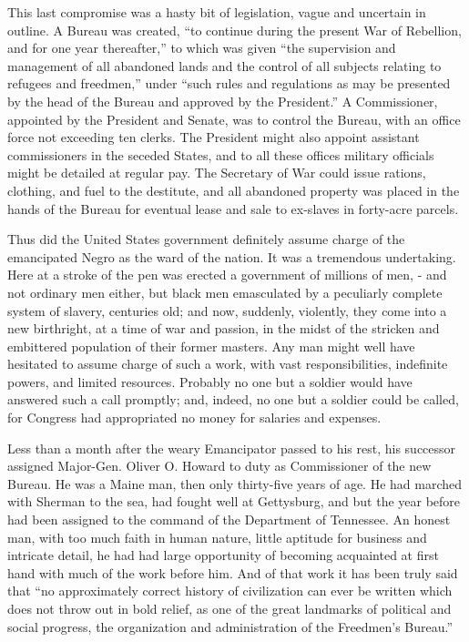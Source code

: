 This last compromise was a hasty bit of legislation, vague and uncertain in outline. A Bureau was created, “to continue during the present War of Rebellion, and for one year thereafter,” to which was given “the supervision and management of all abandoned lands and the control of all subjects relating to refugees and freedmen,” under “such rules and regulations as may be presented by the head of the Bureau and approved by the President.” A Commissioner, appointed by the President and Senate, was to control the Bureau, with an office force not exceeding ten clerks. The President might also appoint assistant commissioners in the seceded States, and to all these offices military officials might be detailed at regular pay. The Secretary of War could issue rations, clothing, and fuel to the destitute, and all abandoned property was placed in the hands of the Bureau for eventual lease and sale to ex-slaves in forty-acre parcels.\par

Thus did the United States government definitely assume charge of the emancipated Negro as the ward of the nation. It was a tremendous undertaking. Here at a stroke of the pen was erected a government of millions of men, - and not ordinary men either, but black men emasculated by a peculiarly complete system of slavery, centuries old; and now, suddenly, violently, they come into a new birthright, at a time of war and passion, in the midst of the stricken and embittered population of their former masters. Any man might well have hesitated to assume charge of such a work, with vast responsibilities, indefinite powers, and limited resources. Probably no one but a soldier would have answered such a call promptly; and, indeed, no one but a soldier could be called, for Congress had appropriated no money for salaries and expenses.\par

Less than a month after the weary Emancipator passed to his rest, his successor assigned Major-Gen. Oliver O. Howard to duty as Commissioner of the new Bureau. He was a Maine man, then only thirty-five years of age. He had marched with Sherman to the sea, had fought well at Gettysburg, and but the year before had been assigned to the command of the Department of Tennessee. An honest man, with too much faith in human nature, little aptitude for business and intricate detail, he had had large opportunity of becoming acquainted at first hand with much of the work before him. And of that work it has been truly said that “no approximately correct history of civilization can ever be written which does not throw out in bold relief, as one of the great landmarks of political and social progress, the organization and administration of the Freedmen’s Bureau.”\par

